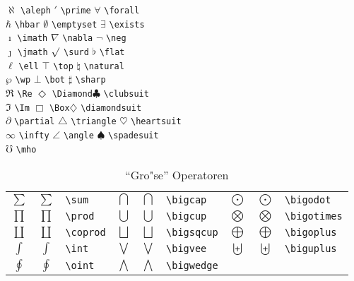\begin{table}[!htbp]
\caption[Verschiedene sonstige Symbole]%
        {Verschiedene sonstige Symbole
         (\footnotemark[1] ben"otigt Paket \texttt{latexsym})}
\begin{symbols}
$\aleph $\> \verb|\aleph| \>$\prime $\> \verb|\prime| \>
$\forall $\> \verb|\forall|  \\
$\hbar $\> \verb|\hbar| \>$\emptyset $\> \verb|\emptyset| \>
$\exists $\> \verb|\exists|  \\
$\imath $\> \verb|\imath| \>$\nabla $\> \verb|\nabla| \>
$\neg $\> \verb|\neg|  \\
$\jmath $\> \verb|\jmath| \>$\surd $\> \verb|\surd| \>
$\flat $\> \verb|\flat| \\
$\ell $\> \verb|\ell| \>$\top $\> \verb|\top| \>
$\natural $\> \verb|\natural| \\
$\wp $\> \verb|\wp| \>$\bot $\> \verb|\bot| \>$\sharp $\> \verb|\sharp| \\
$\Re $\> \verb|\Re| \>$\Diamond $\> \verb|\Diamond|\footnotemark[1] \>$\clubsuit $\> \verb|\clubsuit| \\
$\Im $\> \verb|\Im| \>$\Box $\> \verb|\Box|\footnotemark[1] \>$\diamondsuit $\>
\verb|\diamondsuit| \\
$\partial $\> \verb|\partial| \>$\triangle $\> \verb|\triangle| \>
$\heartsuit $\> \verb|\heartsuit| \\
$\infty $\> \verb|\infty| \>$\angle $\> \verb|\angle| \>
$\spadesuit $\> \verb|\spadesuit| \\
$\mho $\> \verb|\mho|\footnotemark[1] \\
\end{symbols}
\end{table}


\begin{table}[!htbp]
\caption{"`Gro"se"' Operatoren}
\begin{trivlist}\item
\begin{tabular}{@{}ccl@{\qquad}cll@{\qquad}ccl@{}}
$\sum$     & $\displaystyle \sum$    & \verb|\sum|
  & $\bigcap$    & $\displaystyle\bigcap$    & \verb|\bigcap|
  & $\bigodot$   & $\displaystyle\bigodot$   & \verb|\bigodot| \\[6pt]
$\prod$    & $\displaystyle\prod$    & \verb|\prod|
  & $\bigcup$    & $\displaystyle\bigcup$    & \verb|\bigcup|
  & $\bigotimes$ & $\displaystyle\bigotimes$ & \verb|\bigotimes| \\[6pt]
$\coprod$  & $\displaystyle\coprod$  & \verb|\coprod|
  & $\bigsqcup$  & $\displaystyle\bigsqcup$  & \verb|\bigsqcup|
  & $\bigoplus$  & $\displaystyle\bigoplus$  & \verb|\bigoplus| \\[6pt]
$\int$     & $\displaystyle\int$     & \verb|\int|
  & $\bigvee$    & $\displaystyle\bigvee$    & \verb|\bigvee|
  & $\biguplus$  & $\displaystyle\biguplus$  & \verb|\biguplus| \\[6pt]
$\oint$    & $\displaystyle\oint$    & \verb|\oint|
  & $\bigwedge$  & $\displaystyle\bigwedge$  & \verb|\bigwedge|
\end{tabular}
\end{trivlist}
\end{table}


